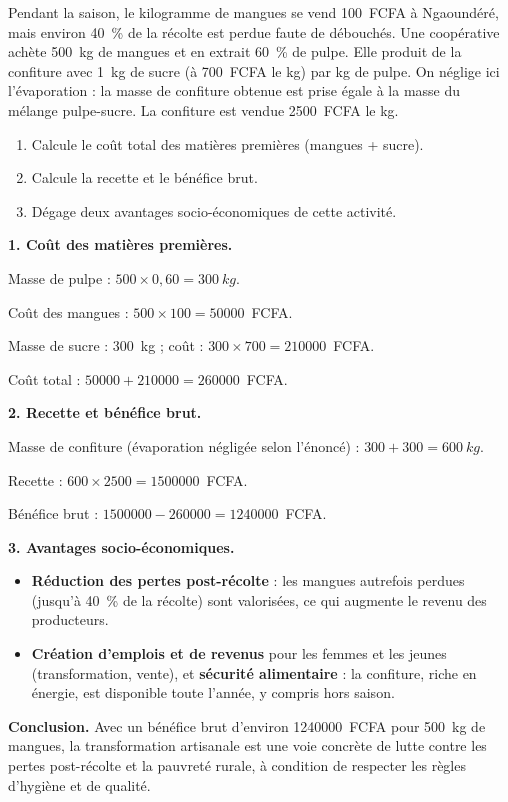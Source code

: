\documentclass[11pt]{article}
\begin{document}
\begin{exoresolu}
Pendant la saison, le kilogramme de mangues se vend \num{100}~FCFA à Ngaoundéré, mais environ \SI{40}{\percent} de la récolte est perdue faute de débouchés. Une coopérative achète \SI{500}{kg} de mangues et en extrait \SI{60}{\percent} de pulpe. Elle produit de la confiture avec \SI{1}{kg} de sucre (à \num{700}~FCFA le kg) par kg de pulpe. On néglige ici l'évaporation : la masse de confiture obtenue est prise égale à la masse du mélange pulpe-sucre. La confiture est vendue \num{2500}~FCFA le kg.
\begin{enumerate}
\item Calcule le coût total des matières premières (mangues + sucre).
\item Calcule la recette et le bénéfice brut.
\item Dégage deux avantages socio-économiques de cette activité.
\end{enumerate}
\tcblower
\textbf{1. Coût des matières premières.}

Masse de pulpe : $500 \times 0{,}60 = \SI{300}{kg}$.

Coût des mangues : $500 \times 100 = \num{50000}$~FCFA.

Masse de sucre : \SI{300}{kg} ; coût : $300 \times 700 = \num{210000}$~FCFA.

Coût total : $\num{50000} + \num{210000} = \num{260000}$~FCFA.

\textbf{2. Recette et bénéfice brut.}

Masse de confiture (évaporation négligée selon l'énoncé) : $300 + 300 = \SI{600}{kg}$.

Recette : $600 \times \num{2500} = \num{1500000}$~FCFA.

Bénéfice brut : $\num{1500000} - \num{260000} = \num{1240000}$~FCFA.

\textbf{3. Avantages socio-économiques.}
\begin{itemize}
\item \textbf{Réduction des pertes post-récolte} : les mangues autrefois perdues (jusqu'à \SI{40}{\percent} de la récolte) sont valorisées, ce qui augmente le revenu des producteurs.
\item \textbf{Création d'emplois et de revenus} pour les femmes et les jeunes (transformation, vente), et \textbf{sécurité alimentaire} : la confiture, riche en énergie, est disponible toute l'année, y compris hors saison.
\end{itemize}

\textbf{Conclusion.} Avec un bénéfice brut d'environ \num{1240000}~FCFA pour \SI{500}{kg} de mangues, la transformation artisanale est une voie concrète de lutte contre les pertes post-récolte et la pauvreté rurale, à condition de respecter les règles d'hygiène et de qualité.
\end{exoresolu}
\end{document}

